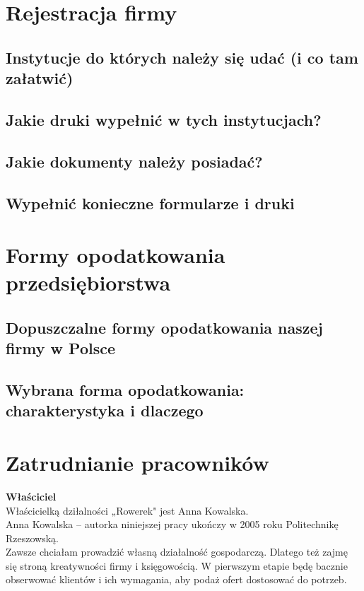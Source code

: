 \documentclass{sprawozdanie-agh}
\begin{document}
	\section{Rejestracja firmy}

		\subsection{Instytucje do których należy się udać (i co tam załatwić)}
		\subsection{Jakie druki wypełnić w tych instytucjach?}
		\subsection{Jakie dokumenty należy posiadać?}
		\subsection{Wypełnić konieczne formularze i druki}

	\section{Formy opodatkowania przedsiębiorstwa}

		\subsection{Dopuszczalne formy opodatkowania naszej firmy w Polsce}
		\subsection{Wybrana forma opodatkowania: charakterystyka i dlaczego}

	\section{Zatrudnianie pracowników}

		\textbf{Właściciel}\\
		Właścicielką dziłalności „Rowerek" jest Anna Kowalska.\\
		Anna Kowalska – autorka niniejszej pracy ukończy w 2005 roku Politechnikę Rzeszowską. \\
		Zawsze chciałam prowadzić własną działalność gospodarczą. Dlatego też zajmę się stroną kreatywności firmy i księgowością. W pierwszym etapie będę bacznie obserwować klientów i ich wymagania, aby podaż ofert dostosować do potrzeb.
		
\end{document}
